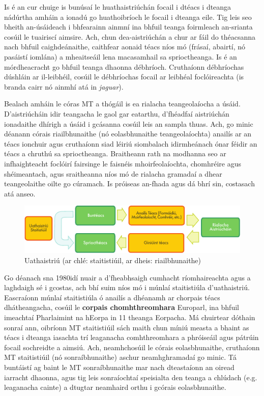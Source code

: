 \documentclass[]{../../metanetpaper}
\begin{document}
\begin{multicols}{2}

Is é an cur chuige is bunúsaí le huathaistriúchán focail i dtéacs i dteanga nádúrtha amháin a ionadú go huathoibríoch le focail i dteanga eile. Tig leis seo bheith an-úsáideach i bhfearainn ainmní ina bhfuil teanga foirmleach an-srianta cosúil le tuairiscí aimsire. Ach, chun dea-aistriúchán a chur ar fáil do théacsanna nach bhfuil caighdeánaithe, caithfear aonaid téacs níos mó (frásaí, abairtí, nó pasáistí iomlána) a mheaitseáil lena macasamhail sa sprioctheanga. Is é an mórdheacracht go bhfuil teanga dhaonna débhríoch. Cruthaíonn débhríochas dúshláin ar il-leibhéil, cosúil le débhríochas focail ar leibhéal foclóireachta (is branda cairr nó ainmhí atá in \textit{jaguar}).

Bealach amháin le córas MT a thógáil is ea rialacha teangeolaíocha a úsáid. D’aistriúcháin idir teangacha le gaol gar eatarthu, d’fhéadfaí aistriúchán ionadaithe dhírigh a úsáid i gcásanna cosúil leis an sampla thuas. Ach, go minic déanann córais riailbhunaithe (nó eolasbhunaithe teangeolaíochta) anailís ar an téacs ionchuir agus cruthaíonn siad léiriú siombalach idirmheánach ónar féidir an téacs a chruthú sa sprioctheanga. Braitheann rath na modhanna seo ar infhaighteacht foclóirí fairsinge le faisnéis mhoirfeolaíochta, chomhréire agus shéimeantach, agus sraitheanna níos mó de rialacha gramadaí a dhear teangeolaithe oilte go cúramach. Is próiseas an-fhada agus dá bhrí sin, costasach atá anseo.

\begin{figure}[htb]
  \center
  \includegraphics[width=\textwidth]{../_media/irish/machine_translation}
  \caption{Uathaistriú (ar chlé: staitistiúil, ar dheis: riailbhunaithe)}
  \label{fig:mtarch_de}
\end{figure}

Go déanach sna 1980idí nuair a d’fheabhsaigh cumhacht ríomhaireachta agus a laghdaigh sé i gcostas, ach bhí suim níos mó i múnlaí staitistiúla d’uathaistriú. Eascraíonn múnlaí staitistiúla ó anailís a dhéanamh ar chorpais téacs dhátheangacha, cosúil le \textbf{corpais chomhthreomhara} Europarl, ina bhfuil imeachtaí Pharlaimint na hEorpa in 11 theanga Eorpacha. Má chuirtear dóthain sonraí ann, oibríonn MT staitistiúil sách maith chun míniú measta a bhaint as téacs i dteanga iasachta trí leaganacha comhthreomhara a phróiseáil agus pátrúin focail sochreidte a aimsiú. Ach, neamhchosúil le córais eolasbhunaithe, cruthaíonn MT staitistiúil (nó sonraíbhunaithe) aschur neamhghramadaí go minic. Tá buntáistí ag baint le MT sonraíbhunaithe mar nach dteastaíonn an oiread iarracht dhaonna, agus tig leis sonraíochtaí speisialta den teanga a chlúdach (e.g. leaganacha cainte) a dtugtar neamhaird orthu i gcórais eolasbhunaithe. 


\end{multicols}
\end{document}

